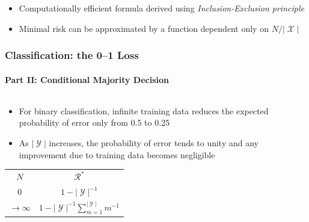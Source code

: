 \documentclass[aspectratio=169,usenames,dvipsnames]{beamer}
\DeclareMathOperator{\Xcal}{\mathcal{X}}
\DeclareMathOperator{\Ycal}{\mathcal{Y}}
\DeclareMathOperator{\Rcal}{\mathcal{R}}
\begin{document}
\begin{frame}
\begin{columns}[c]
\begin{column}{.45\linewidth}
\end{column}

\end{columns}

\vspace{1em}
\begin{itemize}
\item \alert{Computationally efficient} formula derived using \emph{Inclusion-Exclusion principle}
\vspace{0.25em}
\item Minimal risk can be approximated by a function dependent only on $N/|\Xcal|$
\end{itemize}

\end{frame}



\begin{frame}
\frametitle{Classification: the 0--1 Loss}
\framesubtitle{Part II: Conditional Majority Decision}

\begin{columns}[c]

\begin{column}{.5\linewidth}

\begin{itemize}
\item For binary classification, infinite training data reduces the expected probability of error only from \alert{0.5} to \alert{0.25}
\vspace{0.5em}
\item As $|\Ycal|$ increases, the probability of error tends to unity and any improvement due to training data becomes \alert{negligible}
\end{itemize}

\begin{table}
\renewcommand{\arraystretch}{1.3}
\begin{tabular}{| c | c |}
\hline 
$N$ & $\Rcal^*$ \\
\hhline{|=|=|}
$0$ & $1 - |\Ycal|^{-1}$  \\ 
\hline
$\to \infty$ & $1 - |\Ycal|^{-1} \sum_{m=1}^{|\Ycal|} m^{-1}$ \\
\hline
\end{tabular}
\end{table}

\end{column}

\begin{column}{.5\linewidth}


\end{column}
\end{columns}
\end{frame}
\end{document}
